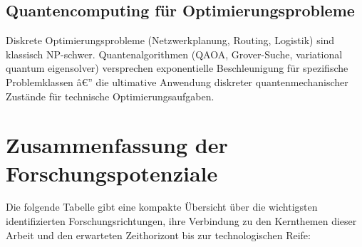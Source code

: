 ﻿\documentclass[12pt,a4paper,titlepage]{report}
\begin{document}
\subsection{Quantencomputing für Optimierungsprobleme}

Diskrete Optimierungsprobleme (Netzwerkplanung, Routing, Logistik) sind klassisch
NP-schwer. Quantenalgorithmen (QAOA, Grover-Suche, variational quantum eigensolver)
versprechen exponentielle Beschleunigung für spezifische Problemklassen â€” die
ultimative Anwendung diskreter quantenmechanischer Zustände für technische
Optimierungsaufgaben.

\section{Zusammenfassung der Forschungspotenziale}

Die folgende Tabelle gibt eine kompakte Übersicht über die wichtigsten
identifizierten Forschungsrichtungen, ihre Verbindung zu den Kernthemen dieser
Arbeit und den erwarteten Zeithorizont bis zur technologischen Reife:
\end{document}
